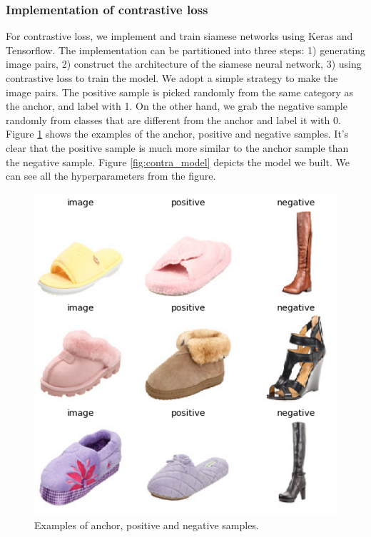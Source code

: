 \subsubsection{Implementation of contrastive loss}
For contrastive loss, we implement and train siamese networks using Keras and Tensorflow. The implementation can be partitioned into three steps: 1) generating image pairs, 2) construct the architecture of the siamese neural network, 3) using contrastive loss to train the model. We adopt a simple strategy to make the image pairs. The positive sample is picked randomly from the same category as the anchor, and label with 1. On the other hand, we grab the negative sample randomly from classes that are different from the anchor and label it with 0. Figure \ref{fig:threesamples} shows the examples of the anchor, positive and negative samples. It's clear that the positive sample is much more similar to the anchor sample than the negative sample. Figure \ref{fig:contra_model} depicts the model we built. We can see all the hyperparameters from the figure. 

\begin{figure}[h]
  \centering
  \includegraphics[width=0.9\linewidth]{figs/threesamples.png}
  \caption{Examples of anchor, positive and negative samples.}
  \label{fig:threesamples}
\end{figure}


